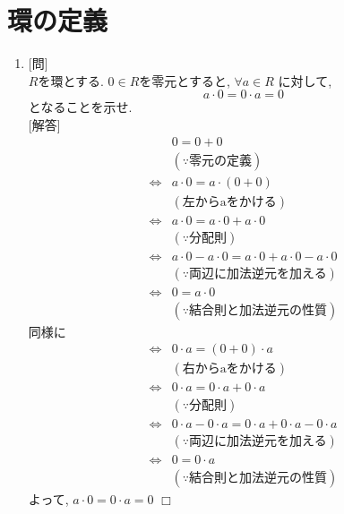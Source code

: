 \documentclass{jsarticle}           %
\theoremstyle{plain}
\theoremstyle{definition}
\theoremstyle{remark}
\begin{document}
\section{環の定義}
\begin{enumerate}[label=\fbox{\arabic*}]
  \item
        {[問]}\\
        $R$を環とする. $0 \in R$を零元とすると, $\forall a \in R$ に対して,
        \[ a \cdot 0 = 0 \cdot a = 0 \] となることを示せ. \\
        {[解答]}\\
        \begin{align*}
                          & 0 = 0 + 0                                                 \\
                          & (\because 零元の定義)                                \\
          \Leftrightarrow & a \cdot 0 = a \cdot ( 0 + 0 )                             \\
                          & (\text{左からaをかける})                           \\
          \Leftrightarrow & a \cdot 0 = a \cdot 0 + a \cdot 0                         \\
                          & (\because \text{分配則})                               \\
          \Leftrightarrow & a \cdot 0 - a \cdot 0 = a \cdot 0 + a \cdot 0 - a \cdot 0 \\
                          & (\because \text{両辺に加法逆元を加える})       \\
          \Leftrightarrow & 0 = a \cdot 0                                             \\
                          & (\because \text{結合則と加法逆元の性質})       
        \end{align*}
        同様に
        \begin{align*}
          \Leftrightarrow & 0 \cdot a = (0 + 0) \cdot a                               \\
                          & (\text{右からaをかける})                           \\
          \Leftrightarrow & 0 \cdot a = 0 \cdot a + 0 \cdot a                         \\
                          & (\because \text{分配則})                               \\
          \Leftrightarrow & 0 \cdot a - 0 \cdot a = 0 \cdot a + 0 \cdot a - 0 \cdot a \\
                          & (\because \text{両辺に加法逆元を加える})       \\
          \Leftrightarrow & 0 = 0 \cdot a                                             \\
                          & (\because \text{結合則と加法逆元の性質})       
        \end{align*}
        よって, $a \cdot 0 = 0 \cdot a = 0$ \hfill $\Box$
        

\end{enumerate}
\end{document}
